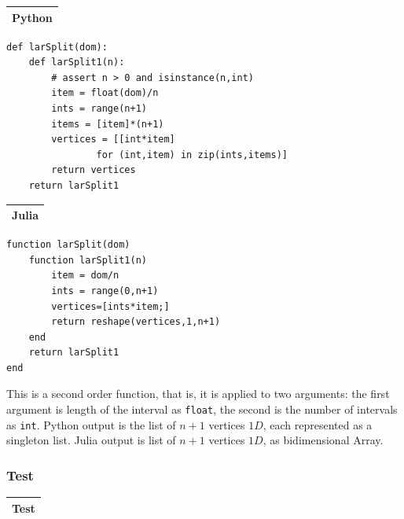 \documentclass{article}
\begin{document}
\begin{flushleft} \small
\begin{center}
\begin{tabular}{|p{16cm}|}
\hline
\cellcolor[gray]{.9}Python\\
\hline
\end{tabular}
\end{center}

\begin{list}{}{} \item
\begin{Verbatim}[tabsize=3]
def larSplit(dom):
    def larSplit1(n):
        # assert n > 0 and isinstance(n,int)
        item = float(dom)/n
        ints = range(n+1)
        items = [item]*(n+1)
        vertices = [[int*item]
                for (int,item) in zip(ints,items)]
        return vertices
    return larSplit1
\end{Verbatim}
\end{list}

\begin{center}
\begin{tabular}{|p{16cm}|}
\hline
\cellcolor[gray]{.9}Julia\\
\hline
\end{tabular}
\end{center}

\begin{list}{}{} \item
\begin{Verbatim}[tabsize=4]
function larSplit(dom)
    function larSplit1(n)
        item = dom/n
        ints = range(0,n+1) 
        vertices=[ints*item;]
        return reshape(vertices,1,n+1)
    end
    return larSplit1
end
\end{Verbatim}
\end{list}
\end{flushleft}
\vspace{2ex}
This is a second order function, that is, it is applied to two arguments: the first argument is length of the interval as \texttt{float}, the second is the number of intervals as \texttt{int}. Python output is the list of $n + 1$ vertices $1D$, each represented as a singleton list. Julia output is list of $n + 1$ vertices $1D$, as bidimensional Array.

\subsubsection{Test}
\begin{center}
\begin{tabular}{|p{16cm}|}
\hline
\cellcolor[gray]{.9}Test\\
\hline
\end{tabular}
\end{center}
\end{document}
